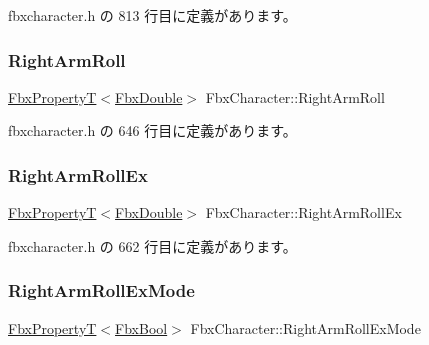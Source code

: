  fbxcharacter.\+h の 813 行目に定義があります。

\mbox{\label{class_fbx_character_a12e97f9c94917b7eb1df15d3bbffe6e2}} 
\subsubsection{\texorpdfstring{Right\+Arm\+Roll}{RightArmRoll}}
{\footnotesize\ttfamily \hyperlink{class_fbx_property_t}{Fbx\+PropertyT}$<$\hyperlink{fbxtypes_8h_a171e72a1c46fc15c1a6c9c31948c1c5b}{Fbx\+Double}$>$ Fbx\+Character\+::\+Right\+Arm\+Roll}



 fbxcharacter.\+h の 646 行目に定義があります。

\mbox{\label{class_fbx_character_a3415bca86b55c4fdf841d452c562e6d0}} 
\subsubsection{\texorpdfstring{Right\+Arm\+Roll\+Ex}{RightArmRollEx}}
{\footnotesize\ttfamily \hyperlink{class_fbx_property_t}{Fbx\+PropertyT}$<$\hyperlink{fbxtypes_8h_a171e72a1c46fc15c1a6c9c31948c1c5b}{Fbx\+Double}$>$ Fbx\+Character\+::\+Right\+Arm\+Roll\+Ex}



 fbxcharacter.\+h の 662 行目に定義があります。

\mbox{\label{class_fbx_character_a3d259881290565268c78fc38e96a7472}} 
\subsubsection{\texorpdfstring{Right\+Arm\+Roll\+Ex\+Mode}{RightArmRollExMode}}
{\footnotesize\ttfamily \hyperlink{class_fbx_property_t}{Fbx\+PropertyT}$<$\hyperlink{fbxtypes_8h_a92e0562b2fe33e76a242f498b362262e}{Fbx\+Bool}$>$ Fbx\+Character\+::\+Right\+Arm\+Roll\+Ex\+Mode}



